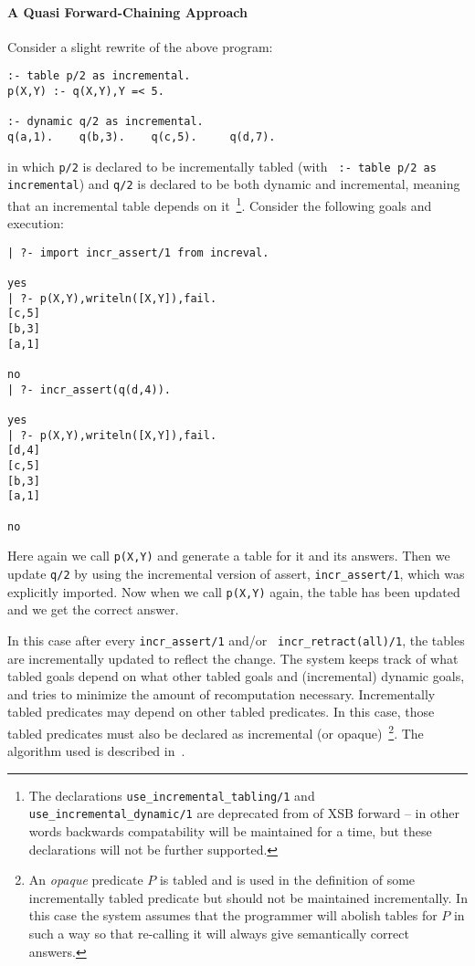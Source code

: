 \paragraph{A Quasi Forward-Chaining Approach}
Consider a slight rewrite of the above program:
\begin{verbatim}
:- table p/2 as incremental.
p(X,Y) :- q(X,Y),Y =< 5.

:- dynamic q/2 as incremental.
q(a,1).    q(b,3).    q(c,5).     q(d,7).
\end{verbatim}
in which {\tt p/2} is declared to be incrementally tabled (with {\tt
  :- table p/2 as incremental}) and {\tt q/2} is declared to be both
dynamic and incremental, meaning that an incremental table depends on
it~\footnote{The declarations {\tt use\_incremental\_tabling/1} and
  {\tt use\_incremental\_dynamic/1} are deprecated from \version{} of
  XSB forward -- in other words backwards compatability will be
  maintained for a time, but these declarations will not be further
  supported.}.  Consider the following goals and execution:
\begin{verbatim}
| ?- import incr_assert/1 from increval.

yes
| ?- p(X,Y),writeln([X,Y]),fail.
[c,5]
[b,3]
[a,1]

no
| ?- incr_assert(q(d,4)).

yes
| ?- p(X,Y),writeln([X,Y]),fail.
[d,4]
[c,5]
[b,3]
[a,1]

no
\end{verbatim}
Here again we call {\tt p(X,Y)} and generate a table for it and its
answers.  Then we update {\tt q/2} by using the incremental version of
assert, {\tt incr\_assert/1}, which was explicitly imported.  Now when
we call {\tt p(X,Y)} again, the table has been updated and we get the
correct answer.

In this case after every {\tt incr\_assert/1} and/or {\tt
  incr\_retract(all)/1}, the tables are incrementally updated to
reflect the change.  The system keeps track of what tabled goals
depend on what other tabled goals and (incremental) dynamic goals, and
tries to minimize the amount of recomputation necessary.
Incrementally tabled predicates may depend on other tabled predicates.
In this case, those tabled predicates must also be declared as
incremental (or opaque)~\footnote{An {\em opaque} predicate $P$ is
  tabled and is used in the definition of some incrementally tabled
  predicate but should not be maintained incrementally.  In this case
  the system assumes that the programmer will abolish tables for $P$
  in such a way so that re-calling it will always give semantically
  correct answers.}.  The algorithm used is described
in~\cite{SaRa05,Saha06}.

